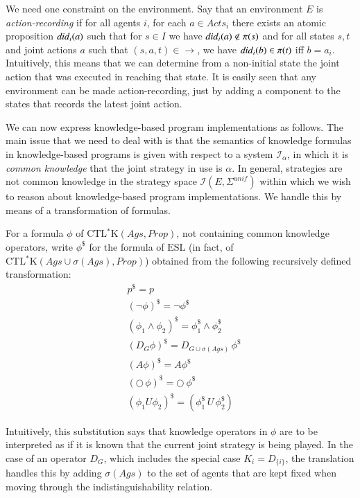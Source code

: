 \documentclass[a4wide]{article}
\newcommand{\CTLsK}{\mbox{CTL$^*$K}}
\newcommand{\ESL}{\mbox{ESL}}
\newcommand{\trans}{\rightarrow}
\newcommand{\until}{U}
\newcommand{\Prop}{Prop}
\theoremstyle{examplesty}
\newcommand{\strat}{\sigma}
\newcommand{\Ags}{\mathit{Ags}}
\newcommand{\I}{\mathcal{I}}
\newcommand{\Env}{E}
\newcommand{\Acts}{\mathit{Acts}}
\newcommand{\nxt}{\Circle}
\newcommand{\unif}{\mathit{unif}}
\newcommand{\Strat}{\Sigma}
\begin{document}
We need one constraint on the environment. 
Say that an environment $\Env$ is {\em action-recording} if 
for all agents $i$,  
for each $a\in \Acts_i$
there exists an  atomic  proposition $\mathit{did}_i(a)$ such that  for $s\in I$ we have $\mathit{did}_i(a) \not \in \pi(s)$ 
and for all states $s,t$ and joint actions $a$ such that $(s,a,t) \in \trans$, 
we have $\mathit{did}_i(b) \in \pi(t)$ iff $b= a_i$.
Intuitively, this means that we can determine from a non-initial state the joint action 
that was executed in reaching that state. 
It is easily seen that any environment can be made action-recording, just by adding 
a component to the states that records the latest joint action. 

We can now express  knowledge-based program 
implementations as follows.  The main issue that we need to 
deal with is that the semantics of knowledge formulas in knowledge-based programs 
is given with respect to a system $\I_\alpha$, in which it 
is {\em common knowledge} that the joint strategy in use is $\alpha$. 
In general, strategies are not common knowledge in the strategy space 
$\I(\Env, \Strat^\unif)$
within which we wish to reason about knowledge-based program implementations.  
We handle this by means of a transformation of formulas. 

\newcommand{\trlk}[1]{#1^\$}

For a formula 
$\phi$ of $\CTLsK(\Ags,\Prop)$, 
not containing common knowledge operators,
write $\trlk{\phi}$ for the formula of $\ESL$ 
(in fact, of 
$\CTLsK(\Ags \cup \strat(\Ags), \Prop)$)
obtained from the
following recursively defined transformation: 
\begin{align*} 
& \trlk{p} = p \\ 
&  \trlk{(\neg \phi)} = \neg \trlk{\phi} \\
& \trlk{(\phi_1\land \phi_2)} = \trlk{\phi_1} \land \trlk{\phi_2} \\ 
&  \trlk{(D_G\phi)}  = D_{G\cup \strat(\Ags)}\, \trlk{\phi}  \\ 
& 
\trlk{(A \phi)} = A \trlk{\phi} \\
& 
\trlk{ (\nxt \, \phi) } = \nxt ~ \trlk{\phi} \\
& \trlk{(\phi_1 \until \phi_2)} =  (\trlk{\phi_1}\,  \until \, \trlk{\phi_2})
\end{align*} 


Intuitively, this substitution says that knowledge operators  in $\phi$ are to be interpreted as if 
it is  known that the current joint strategy is being played. In the case of an operator 
$D_G$, 
which includes the special case 
$K_i = D_{\{i\}}$, 
the 
translation handles this by adding $\strat(\Ags)$ to the set of agents that are kept fixed when moving through the
indistinguishability relation.
\end{document}
